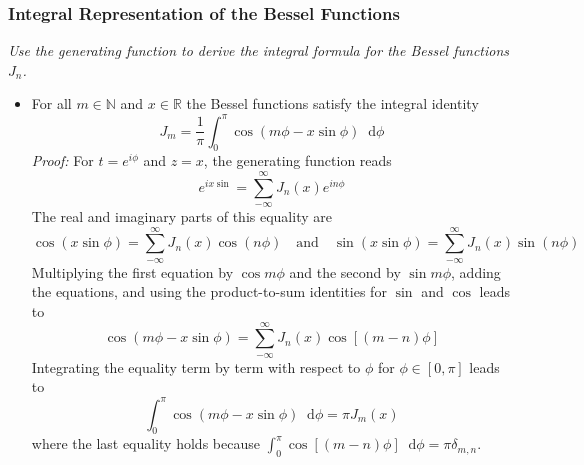 \documentclass[11pt, a4paper]{article}
\newcommand{\question}[1]{\textit{#1}\vspace{2mm}}
\newcommand{\R}{\mathbb{R}} %
\newcommand{\diff}{\mathop{}\!\mathrm{d}} %
\begin{document}
\subsubsection{Integral Representation of the Bessel Functions}
\question{Use the generating function to derive the integral formula for the Bessel functions $ J_{n} $.}
\begin{itemize}
	\item For all $ m \in \mathbb{N} $ and $ x \in \R $ the Bessel functions satisfy the integral identity
	\begin{equation*}
		J_{m} = \frac{1}{\pi}\int_{0}^{\pi}\cos(m\phi - x\sin \phi)\diff \phi	
	\end{equation*}
	\textit{Proof:} For $ t = e^{i\phi} $ and $ z = x $, the generating function reads
	\begin{equation*}
		e^{ix\sin} = \sum_{-\infty}^{\infty}J_{n}(x)e^{in\phi}
	\end{equation*}
	The real and imaginary parts of this equality are
	\begin{equation*}
		\cos (x \sin \phi) = \sum_{-\infty}^{\infty}J_{n}(x)\cos(n\phi) \quad \text{and} \quad \sin(x\sin\phi) = \sum_{-\infty}^{\infty}J_{n}(x)\sin(n\phi)
	\end{equation*}
	Multiplying the first equation by $ \cos m \phi $ and the second by $ \sin m \phi $, adding the equations, and using the product-to-sum identities for $ \sin $ and $ \cos $ leads to
	\begin{equation*}
		\cos(m\phi - x \sin \phi) = \sum_{-\infty}^{\infty}J_{n}(x)\cos[(m-n)\phi]
	\end{equation*}
	Integrating the equality term by term with respect to $ \phi $ for $ \phi \in [0, \pi] $ leads to
	\begin{equation*}
		\int_{0}^{\pi} 	\cos(m\phi - x \sin \phi) \diff \phi = \pi J_{m}(x)
	\end{equation*}
	where the last equality holds because $ \int_{0}^{\pi} \cos[(m-n)\phi] \diff \phi = \pi \delta_{m, n}$.
\end{itemize}
\end{document}
